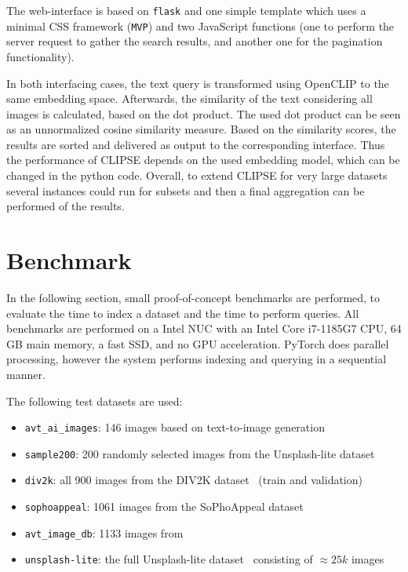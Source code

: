 \documentclass{article}
\begin{document}
The web-interface is based on \texttt{flask} and one simple template which uses a minimal CSS framework (\texttt{MVP}) and two JavaScript functions (one to perform the server request to gather the search results, and another one for the pagination functionality).

In both interfacing cases, the text query is transformed using OpenCLIP to the same embedding space.
Afterwards, the similarity of the text considering all images is calculated, based on the dot product.
The used dot product can be seen as an unnormalized cosine similarity measure.
Based on the similarity scores, the results are sorted and delivered as output to the corresponding interface.
Thus the performance of CLIPSE depends on the used embedding model, which can be changed in the python code.
Overall, to extend CLIPSE for very large datasets several instances could run for subsets and then a final aggregation can be performed of the results.

\section{Benchmark}
In the following section, small proof-of-concept benchmarks are performed, to evaluate the time to index a dataset and the time to perform queries.
All benchmarks are performed on a Intel NUC with an Intel Core i7-1185G7 CPU, 64 GB main memory, a fast SSD, and no GPU acceleration.
PyTorch does parallel processing, however the system performs indexing and querying in a sequential manner.

The following test datasets are used:
\begin{itemize}
    \item \texttt{avt\_ai\_images}: 146 images based on text-to-image generation~\cite{goering2023ai,goering2023aiquality}
    \item \texttt{sample200}: 200 randomly selected images from the Unsplash-lite dataset~\cite{unsplash}
    \item \texttt{div2k}: all 900 images from the DIV2K dataset~\cite{agustsson2017ntire} (train and validation)
    \item \texttt{sophoappeal}: 1061 images from the SoPhoAppeal dataset~\cite{goering2023imageappeal}
    \item \texttt{avt\_image\_db}: 1133 images from~\cite{goering2019Intra}
    \item \texttt{unsplash-lite}: the full Unsplash-lite dataset~\cite{unsplash} consisting of $\approx 25k$ images
\end{itemize}
\end{document}
